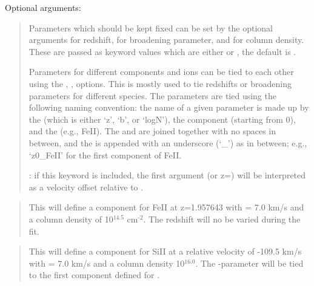 \documentclass[letterpaper,10pt,english]{sphinxmanual}
\begin{document}
Optional arguments:
\begin{quote}

Parameters which should be kept fixed can be set by the optional arguments  for redshift,
 for broadening parameter, and  for column density.
These are passed as keyword values which are either  or , the default is .

Parameters for different components and ions can be tied to each other using the
, ,  options. This is mostly used to tie redshifts or broadening parameters
for different species.
The parameters are tied using the following naming convention:
the name of a given parameter is made up by the  (which is either ‘z’, ‘b’, or ‘logN’),
the component  (starting from 0), and the  (e.g., FeII).
The  and  are joined together with no spaces in between,
and the  is appended with an underscore (‘\_’) as in between; e.g., ‘z0\_FeII’ for the first
component of FeII.

 : if this keyword is included, the first argument (or z=) will be interpreted
as a velocity offset relative to .
\end{quote}

\begin{sphinxShadowBox}

\begin{quote}

This will define a component for FeII at z=1.957643 with  = 7.0 km/s and a column density
of 10$^{\text{14.5}}$ cm$^{\text{-2}}$. The redshift will no be varied during the fit.
\end{quote}

\begin{quote}

This will define a component for SiII at a relative velocity of -109.5 km/s
with  = 7.0 km/s and a column density 10$^{\text{16.0}}$.
The -parameter will be tied to the first component defined for .
\end{quote}
\end{sphinxShadowBox}
\end{document}
